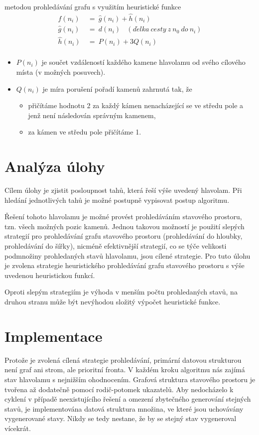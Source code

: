 \documentclass[12pt]{article}
\begin{document}
\vspace{.3cm}

metodou prohledávání grafu s využitím heuristické funkce
\begin{align*}
\hat{f}(n_i)~&=~\hat{g}(n_i) + \hat{h}(n_i) \\
\hat{g}(n_i)~&=~d(n_i)~~~~(d\acute{e}lka~cesty~z~n_0~do~n_i) \\
\hat{h}(n_i)~&=~P(n_i) + 3 Q(n_i) \\
\end{align*}

\begin{itemize}
	\item $P(n_i)$ je součet vzdáleností každého kamene hlavolamu od svého
          cílového místa (v možných posuvech).
	\item $Q(n_i)$ je míra porušení pořadí kamenů zahrnutá tak, že
	\begin{itemize}
		\item přičítáme hodnotu 2 za každý kámen nenacházející se ve středu
              pole a jenž není následován správným kamenem,
		\item za kámen ve středu pole přičítáme 1.
	\end{itemize}
\end{itemize}


\section{Analýza úlohy}
Cílem úlohy je zjistit posloupnost tahů, která řeší výše uvedený hlavolam.  Při
hledání jednotlivých tahů je možné postupně vypisovat postup algoritmu.

Řešení tohoto hlavolamu je možné provést prohledáváním stavového prostoru, tzn.
všech možných pozic kamenů. Jednou takovou možností je použití slepých
strategií pro prohledávání grafu stavového prostoru (prohledávání do hloubky,
prohledávání do šířky), nicméně efektivnější strategií, co se týče velikosti
podmnožiny prohledaných stavů hlavolamu, jsou cílené strategie. Pro tuto úlohu
je zvolena strategie heuristického prohledávání grafu stavového prostoru s výše
uvedenou heuristickou funkcí.

Oproti slepým strategiím je výhoda v menším počtu prohledaných stavů, na druhou
stranu může být nevýhodou složitý výpočet heuristické funkce.

\section{Implementace}
Protože je zvolená cílená strategie prohledávání, primární datovou strukturou
není graf ani strom, ale prioritní fronta. V každém kroku algoritmu nás zajímá
stav hlavolamu s nejnižším ohodnocením. Grafová struktura stavového prostoru je
tvořena až dodatečně pomocí rodič-potomek ukazatelů. Aby nedocházelo k cyklení
v případě neexistujícího řešení a omezení zbytečného generování stejných stavů,
je implementována datová struktura množina, ve které jsou uchovávány
vygenerované stavy. Nikdy se tedy nestane, že by se stejný stav vygeneroval
vícekrát.
\end{document}
